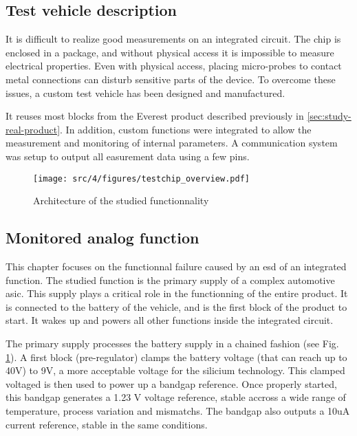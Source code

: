 \subsection{Test vehicle description}

It is difficult to realize good measurements on an integrated circuit.
The chip is enclosed in a package, and without physical access it is impossible to measure electrical properties.
Even with physical access, placing micro-probes to contact metal connections can disturb sensitive parts of the device.
To overcome these issues, a custom test vehicle has been designed and manufactured.

It reuses most blocks from the Everest product described previously in \ref{sec:study-real-product}.
In addition, custom functions were integrated to allow the measurement and monitoring of internal parameters.
A communication system was setup to output all easurement data using a few pins.




\begin{figure}[h]
  \centering
  \texttt{[image: src/4/figures/testchip\_overview.pdf]}
  \caption{Architecture of the studied functionnality}
  \label{testchip_overview}
\end{figure}

\subsection{Monitored analog function}

This chapter focuses on the functionnal failure caused by an \gls{esd} of an integrated function.
The studied function is the primary supply of a complex automotive \gls{asic}.
This supply plays a critical role in the functionning of the entire product.
It is connected to the battery of the vehicle, and is the first block of the product to start.
It wakes up and powers all other functions inside the integrated circuit.

The primary supply processes the battery supply in a chained fashion (see Fig. \ref{testchip_overview}).
A first block (pre-regulator) clamps the battery voltage (that can reach up to 40V) to 9V, a more acceptable voltage for the silicium technology.
This clamped voltaged is then used to power up a bandgap reference.
Once properly started, this bandgap generates a 1.23 V voltage reference, stable accross a wide range of temperature, process variation and mismatchs.
The bandgap also outputs a 10uA current reference, stable in the same conditions.

